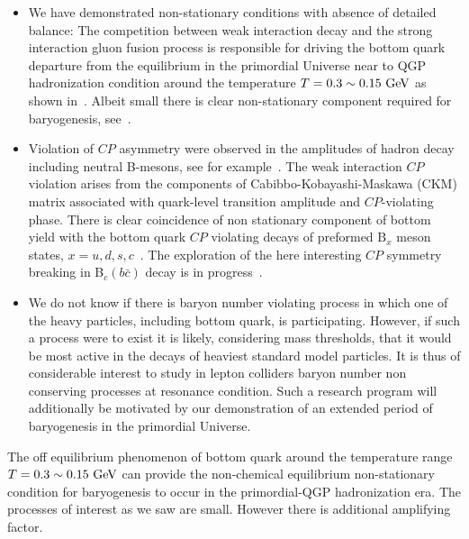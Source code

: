 \begin{itemize}
\item
 We have demonstrated non-stationary conditions with absence of detailed balance: The competition between weak interaction decay and the strong interaction gluon fusion process is responsible for driving the bottom quark departure from the equilibrium in the primordial Universe near to QGP hadronization condition around the temperature $T=0.3\sim0.15\text{ GeV}$ as shown in~. Albeit small there is clear non-stationary component required for baryogenesis, see~.
\item Violation of $CP$ asymmetry were observed in the amplitudes of hadron decay including neutral B-mesons, see for example~\cite{LHCb:2019jta,LHCb:2020vut}. The weak interaction $CP$ violation arises from the components of Cabibbo-Kobayashi-Maskawa (CKM) matrix associated with quark-level transition amplitude and $CP$-violating phase. There is clear coincidence of non stationary component of bottom yield with the bottom quark $CP$ violating decays of preformed $\mathrm{B}_x$ meson states, $x=u,d,s,c$~\cite{Karsch:1987pv,Brambilla:2010vq,Aarts:2011sm,Brambilla:2017zei,Bazavov:2018wmo,Offler:2019eij}. The exploration of the here interesting $CP$ symmetry breaking in B$_c(b\bar c)$ decay is in progress~\cite{Tully:2019ltb,HFLAV:2019otj,ParticleDataGroup:2018ovx}. %
\item
We do not know if there is baryon number violating process in which one of the heavy particles, including bottom quark, is participating. However, if such a process were to exist it is likely, considering mass thresholds, that it would be most active in the decays of heaviest standard model particles. It is thus of considerable interest to study in lepton colliders baryon number non conserving processes at resonance condition. Such a research program will additionally be motivated by our demonstration of an extended period of baryogenesis in the primordial Universe. 
\end{itemize}



The off equilibrium phenomenon of bottom quark around the temperature range $T=0.3\sim0.15\text{ GeV}$ can provide the non-chemical equilibrium non-stationary condition for baryogenesis to occur in the primordial-QGP hadronization era. The processes of interest as we saw are small. However there is additional amplifying factor. 
 
